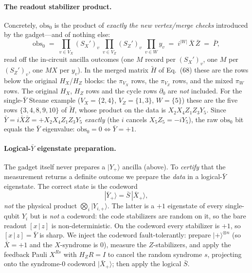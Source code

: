 \documentclass[a4paper, 12pt]{article}
\begin{document}
\paragraph{The readout stabilizer product.}
Concretely, $\mathrm{obs}_0$ is the product of \emph{exactly the new vertex/merge checks}
introduced by the gadget---and of nothing else:
\begin{equation}
\mathrm{obs}_0
\;=\; \prod_{v\in V_X}(S_X')_v \;\prod_{v\in V_Z}(S_Z')_v \;\prod_{v\in W} y_v
\;=\; i^{|W|}\,\bar X\,\bar Z \;=\; \bar P,
\end{equation}
read off the in-circuit ancilla outcomes (one $M$ record per $(S_X')_v$, one $M$ per
$(S_Z')_v$, one $MX$ per $y_v$). In the merged matrix $\tilde H$ of Eq.~(68) these are the rows
below the original $H_X$/$H_Z$ blocks: the $\pi_{V_X}$ rows, the $\pi_{V_Z}$ rows, and the mixed
$\pi_W$ rows. The original $H_X$, $H_Z$ rows and the cycle rows $\partial_0$ are \emph{not}
included. For the single-$\bar Y$ Steane example ($V_X=\{2,4\}$, $V_Z=\{1,3\}$, $W=\{5\}$) these
are the five rows $\{3,4,8,9,10\}$ of $\tilde H$, whose product on the data is
$X_2X_4Z_1Z_3Y_5$. Since $\bar Y = i\bar X\bar Z = +X_2X_4Z_1Z_3Y_5$ \emph{exactly} (the $i$
cancels $X_5Z_5 = -iY_5$), the raw $\mathrm{obs}_0$ bit equals the $\bar Y$ eigenvalue:
$\mathrm{obs}_0 = 0 \Leftrightarrow \bar Y = +1$.

\paragraph{Logical-$\bar Y$ eigenstate preparation.}
The gadget itself never prepares a $|Y_+\rangle$ ancilla (above). To \emph{certify} that the
measurement returns a definite outcome we prepare the \emph{data} in a logical-$\bar Y$
eigenstate. The correct state is the codeword
\begin{equation}
|\bar Y_+\rangle = \bar S\,|\bar X_+\rangle,
\end{equation}
\emph{not} the physical product $\bigotimes_i |Y_{i,+}\rangle$. The latter is a $+1$ eigenstate
of every single-qubit $Y_i$ but is \emph{not} a codeword: the code stabilizers are random on it,
so the bare readout $[x\,|\,z]$ is non-deterministic. On the codeword every stabilizer is $+1$,
so $[x\,|\,z] = \bar Y$ is sharp. We inject the codeword fault-tolerantly: prepare
$|+\rangle^{\otimes n}$ (so $\bar X = +1$ and the $X$-syndrome is $0$), measure the
$Z$-stabilizers, and apply the feedback Pauli $X^{R s}$ with $H_Z R = I$ to cancel the random
syndrome $s$, projecting onto the syndrome-$0$ codeword $|\bar X_+\rangle$; then apply the
logical $\bar S$.
\end{document}
